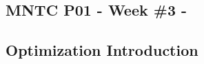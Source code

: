 





\begin{center}
\subsection*{MNTC P01 - Week \#3 - \WeekTitleThree}
\end{center}


\subsection*{Optimization Introduction}
\begin{enumerate}[1.]
\begin{multicols}{2}


\end{multicols}
\end{enumerate}

